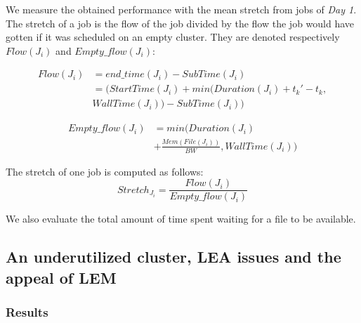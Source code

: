 \documentclass[conference,10pt]{IEEEtran}
\newcommand{\file}{\ensuremath{\mathit{File}}\xspace}
\newcommand{\memory}{\ensuremath{\mathit{Mem}}\xspace}
\newcommand{\duration}{\mathit{Duration}\xspace}
\newcommand{\bandwidth}{\mathit{BW}\xspace}
\newcommand{\submissiontime}{\mathit{SubTime}\xspace}
\newcommand{\walltime}{\mathit{WallTime}\xspace}
\newcommand{\start}{\mathit{StartTime}\xspace}
\begin{document}
We measure the obtained performance with the mean
stretch from jobs of \textit{Day 1}.
The stretch of a job is the flow of the job divided
by the flow the job would have gotten if it was scheduled on an empty cluster.
They are denoted respectively $Flow(J_i)$ and $Empty\_flow(J_i)$:

\begin{equation}
\begin{split}
Flow(J_i) & = end\_time(J_i) - \submissiontime(J_i) \\
& = (\start(J_i) + min(\duration(J_i) + t_k' - t_k, \\
& \walltime(J_i)) - \submissiontime(J_i))
\end{split}
\end{equation}

\begin{equation}
\begin{split}
Empty\_flow(J_i) & = min(\duration(J_i) \\
& + \frac{\memory(\file(J_i))}{\bandwidth}, \walltime(J_i))
\end{split}
\end{equation}

The stretch of one job is computed as follows:
\begin{equation}
Stretch_{J_i} = \frac{Flow(J_i)}{Empty\_flow(J_i)}
\end{equation}

We also evaluate the total amount of time spent waiting for a file to be available.

\subsection{An underutilized cluster, LEA issues and the appeal of LEM}

\subsubsection{Results}
\end{document}
